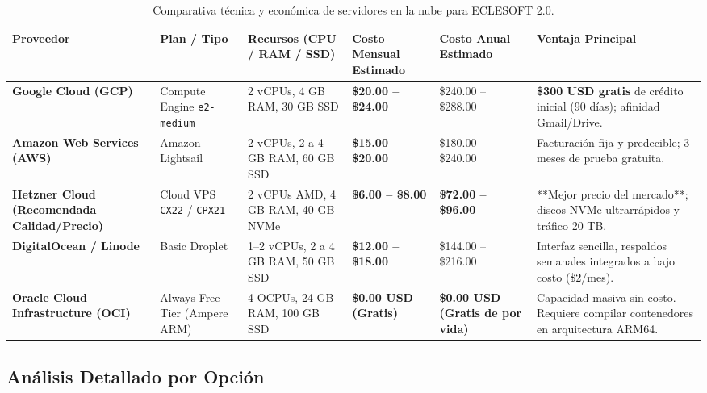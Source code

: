 \documentclass[11pt,a4paper]{article}
\begin{document}
\begin{table}[h!]
\centering
\footnotesize
\begin{tabularx}{\textwidth}{p{2.3cm} p{2.6cm} p{2.4cm} p{2.1cm} p{2.2cm} p{2.5cm}}
\toprule
\textbf{Proveedor} & \textbf{Plan / Tipo} & \textbf{Recursos (CPU / RAM / SSD)} & \textbf{Costo Mensual Estimado} & \textbf{Costo Anual Estimado} & \textbf{Ventaja Principal} \\
\midrule
\textbf{Google Cloud (GCP)} & Compute Engine \texttt{e2-medium} & 2 vCPUs, 4 GB RAM, 30 GB SSD & \textbf{\$20.00 -- \$24.00} & \$240.00 -- \$288.00 & \textbf{\$300 USD gratis} de crédito inicial (90 días); afinidad Gmail/Drive. \\
\addlinespace
\textbf{Amazon Web Services (AWS)} & Amazon Lightsail & 2 vCPUs, 2 a 4 GB RAM, 60 GB SSD & \textbf{\$15.00 -- \$20.00} & \$180.00 -- \$240.00 & Facturación fija y predecible; 3 meses de prueba gratuita. \\
\addlinespace
\textbf{Hetzner Cloud (Recomendada Calidad/Precio)} & Cloud VPS \texttt{CX22} / \texttt{CPX21} & 2 vCPUs AMD, 4 GB RAM, 40 GB NVMe & \textbf{\$6.00 -- \$8.00} & \textbf{\$72.00 -- \$96.00} & **Mejor precio del mercado**; discos NVMe ultrarrápidos y tráfico 20 TB. \\
\addlinespace
\textbf{DigitalOcean / Linode} & Basic Droplet & 1--2 vCPUs, 2 a 4 GB RAM, 50 GB SSD & \textbf{\$12.00 -- \$18.00} & \$144.00 -- \$216.00 & Interfaz sencilla, respaldos semanales integrados a bajo costo (\$2/mes). \\
\addlinespace
\textbf{Oracle Cloud Infrastructure (OCI)} & Always Free Tier (Ampere ARM) & 4 OCPUs, 24 GB RAM, 100 GB SSD & \textbf{\$0.00 USD (Gratis)} & \textbf{\$0.00 USD (Gratis de por vida)} & Capacidad masiva sin costo. Requiere compilar contenedores en arquitectura ARM64. \\
\bottomrule
\end{tabularx}
\caption{Comparativa técnica y económica de servidores en la nube para ECLESOFT 2.0.}
\label{tab:comparativa-hosting}
\end{table}

\subsection{Análisis Detallado por Opción}
\end{document}
